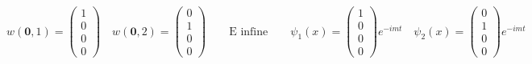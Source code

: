 \begin{equation*}
    w(\mathbf{0}, 1) = \begin{pmatrix} 1 \\ 0 \\ 0 \\ 0 \end{pmatrix} \quad w(\mathbf{0}, 2) = \begin{pmatrix} 0 \\ 1 \\ 0 \\ 0 \end{pmatrix} \qquad \text{E infine} \qquad \psi_1(x) = \begin{pmatrix} 1 \\ 0 \\ 0 \\ 0 \end{pmatrix} e^{-imt} \quad \psi_2(x) = \begin{pmatrix} 0 \\ 1 \\ 0 \\ 0 \end{pmatrix} e^{-imt}
\end{equation*}
